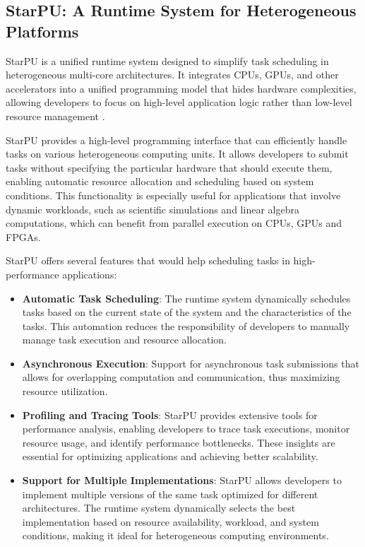 \subsection{StarPU: A Runtime System for Heterogeneous Platforms}

StarPU is a unified runtime system designed to simplify task scheduling in heterogeneous multi-core architectures. It integrates CPUs, GPUs, and other accelerators into a unified programming model that hides hardware complexities, allowing developers to focus on high-level application logic rather than low-level resource management \cite{augonnet2011}.

StarPU provides a high-level programming interface that can efficiently handle tasks on various heterogeneous computing units. It allows developers to submit tasks without specifying the particular hardware that should execute them, enabling automatic resource allocation and scheduling based on system conditions. This functionality is especially useful for applications that involve dynamic workloads, such as scientific simulations and linear algebra computations, which can benefit from parallel execution on CPUs, GPUs and FPGAs\cite{Denis2024}.

StarPU offers several features that would help scheduling tasks in high-performance applications:

\begin{itemize}
    \item \textbf{Automatic Task Scheduling}: The runtime system dynamically schedules tasks based on the current state of the system and the characteristics of the tasks. This automation reduces the responsibility of developers to manually manage task execution and resource allocation.

    \item \textbf{Asynchronous Execution}: Support for asynchronous task submissions that allows for overlapping computation and communication, thus maximizing resource utilization.

    \item \textbf{Profiling and Tracing Tools}: StarPU provides extensive tools for performance analysis, enabling developers to trace task executions, monitor resource usage, and identify performance bottlenecks. These insights are essential for optimizing applications and achieving better scalability.

    \item \textbf{Support for Multiple Implementations}: StarPU allows developers to implement multiple versions of the same task optimized for different architectures. The runtime system dynamically selects the best implementation based on resource availability, workload, and system conditions, making it ideal for heterogeneous computing environments.
\end{itemize}

